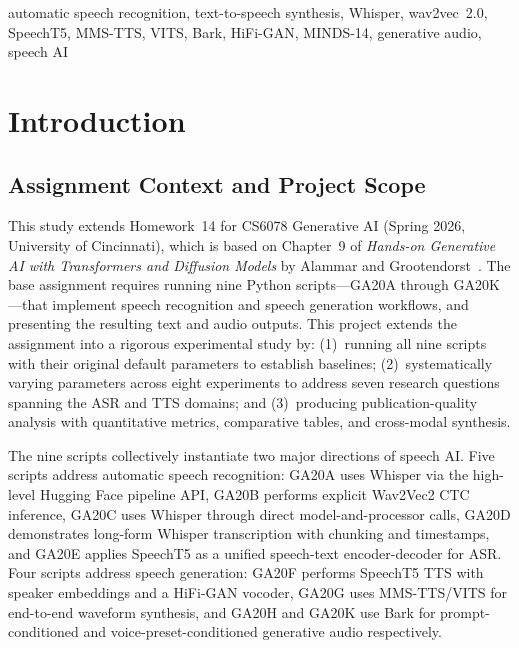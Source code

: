 \documentclass[conference]{IEEEtran}
\begin{document}
\begin{IEEEkeywords}
automatic speech recognition, text-to-speech synthesis, Whisper, wav2vec~2.0, SpeechT5, MMS-TTS, VITS, Bark, HiFi-GAN, MINDS-14, generative audio, speech AI
\end{IEEEkeywords}

\section{Introduction}
\label{sec:intro}

\subsection{Assignment Context and Project Scope}

This study extends Homework~14 for CS6078 Generative AI (Spring 2026, University of Cincinnati), which is based on Chapter~9 of \textit{Hands-on Generative AI with Transformers and Diffusion Models} by Alammar and Grootendorst~\cite{alammar2024}. The base assignment requires running nine Python scripts---GA20A through GA20K---that implement speech recognition and speech generation workflows, and presenting the resulting text and audio outputs. This project extends the assignment into a rigorous experimental study by: (1)~running all nine scripts with their original default parameters to establish baselines; (2)~systematically varying parameters across eight experiments to address seven research questions spanning the ASR and TTS domains; and (3)~producing publication-quality analysis with quantitative metrics, comparative tables, and cross-modal synthesis.

The nine scripts collectively instantiate two major directions of speech AI. Five scripts address automatic speech recognition: GA20A uses Whisper via the high-level Hugging Face pipeline API, GA20B performs explicit Wav2Vec2 CTC inference, GA20C uses Whisper through direct model-and-processor calls, GA20D demonstrates long-form Whisper transcription with chunking and timestamps, and GA20E applies SpeechT5 as a unified speech-text encoder-decoder for ASR. Four scripts address speech generation: GA20F performs SpeechT5 TTS with speaker embeddings and a HiFi-GAN vocoder, GA20G uses MMS-TTS/VITS for end-to-end waveform synthesis, and GA20H and GA20K use Bark for prompt-conditioned and voice-preset-conditioned generative audio respectively.
\end{document}
